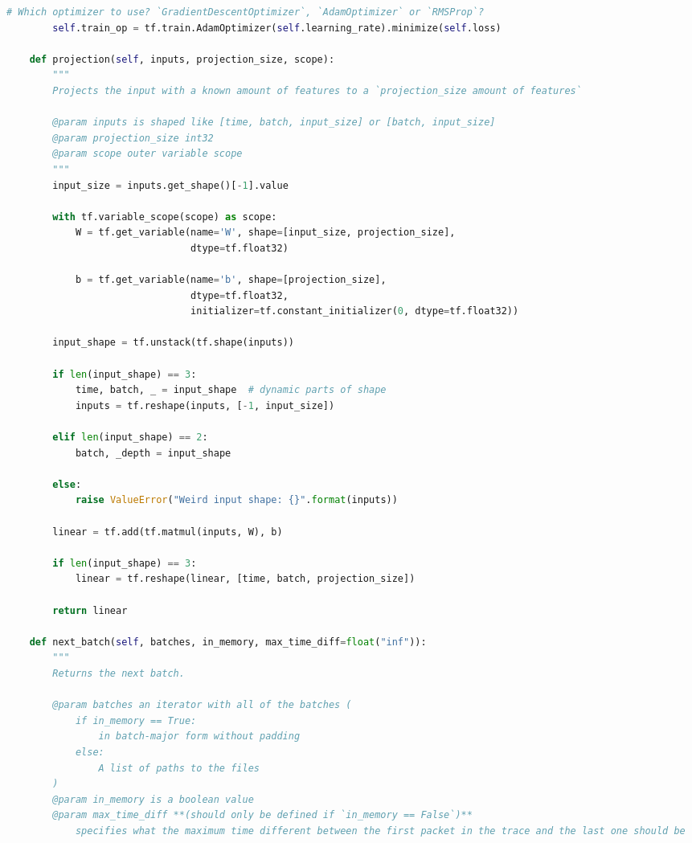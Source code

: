 \begin{landscape}
\begin{multicols}{2}
\begin{lstlisting}[language=Python]
        # Which optimizer to use? `GradientDescentOptimizer`, `AdamOptimizer` or `RMSProp`?
        self.train_op = tf.train.AdamOptimizer(self.learning_rate).minimize(self.loss)

    def projection(self, inputs, projection_size, scope):
        """
        Projects the input with a known amount of features to a `projection_size amount of features`

        @param inputs is shaped like [time, batch, input_size] or [batch, input_size]
        @param projection_size int32
        @param scope outer variable scope
        """
        input_size = inputs.get_shape()[-1].value

        with tf.variable_scope(scope) as scope:
            W = tf.get_variable(name='W', shape=[input_size, projection_size],
                                dtype=tf.float32)

            b = tf.get_variable(name='b', shape=[projection_size],
                                dtype=tf.float32,
                                initializer=tf.constant_initializer(0, dtype=tf.float32))

        input_shape = tf.unstack(tf.shape(inputs))

        if len(input_shape) == 3:
            time, batch, _ = input_shape  # dynamic parts of shape
            inputs = tf.reshape(inputs, [-1, input_size])

        elif len(input_shape) == 2:
            batch, _depth = input_shape

        else:
            raise ValueError("Weird input shape: {}".format(inputs))

        linear = tf.add(tf.matmul(inputs, W), b)

        if len(input_shape) == 3:
            linear = tf.reshape(linear, [time, batch, projection_size])

        return linear

    def next_batch(self, batches, in_memory, max_time_diff=float("inf")):
        """
        Returns the next batch.

        @param batches an iterator with all of the batches (
            if in_memory == True:
                in batch-major form without padding
            else:
                A list of paths to the files
        )
        @param in_memory is a boolean value
        @param max_time_diff **(should only be defined if `in_memory == False`)**
            specifies what the maximum time different between the first packet in the trace and the last one should be


\end{lstlisting}
\end{multicols}
\end{landscape}
